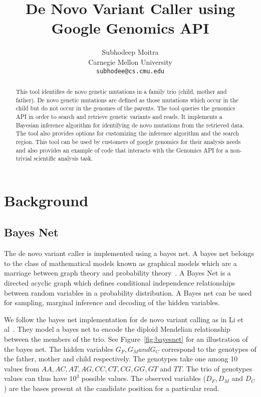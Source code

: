 \documentclass{article}
\begin{document}
\title{De Novo Variant Caller using Google Genomics API}

\author{
	Subhodeep Moitra\\ 
	Carnegie Mellon University \\
	{\tt subhodee@cs.cmu.edu}
}

\maketitle

\begin{abstract}
This tool identifies de novo genetic mutations in a family trio (child, mother and father). De novo genetic mutations are defined as those mutations which occur in the child but do not occur in the genomes of the parents. The tool queries the genomics API in order to search and retrieve genetic variants and reads. It implements a Bayesian inference algorithm for identifying  de novo mutations from the retrieved data. The tool also provides options for customizing the inference algorithm and the search region. This tool can be used by customers of google genomics for their analysis needs and also provides an example of code that interacts with the Genomics API for a non-trivial scientific analysis task.
\end{abstract} 

\section{Background}

\subsection{Bayes Net}
The de novo variant caller is implemented using a bayes net. A bayes net belongs to the class of mathematical models known as graphical models which are a marriage between graph theory and probability theory~\cite{Jordan2008}. A Bayes Net is a directed acyclic graph which defines conditional independence relationships between random variables in a probability distribution. A Bayes net can be used for sampling, marginal inference and decoding of the hidden variables. 

\vspace{5mm} 
We follow the bayes net implementation for de novo variant calling as in Li et al~\cite{Li2012}. They model a bayes net to encode the diploid Mendelian relationship between the members of the trio. See Figure~\ref{fig:bayesnet} for an illustration of the bayes net. The hidden variables $G_{F}, G_{M} and G_{C}$ correspond to the genotypes of the father, mother and child respectively. The genotypes take one among 10 values from $AA, AC, AT, AG, CC, CT, CG, GG, GT$ and $TT$. The trio of genotypes values can thus have $10^3$ possible values. The observed variables ($D_F, D_M$ and $D_C$) are the bases present at the candidate position for a particular read. 
\end{document}
